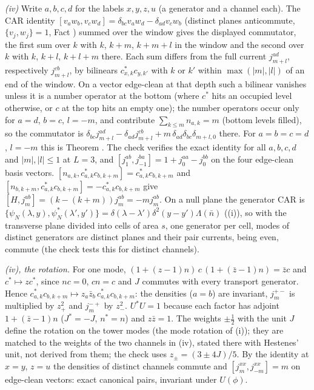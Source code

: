 \emph{(iv)} Write $a, b, c, d$ for the labels $x, y, z, u$ (a generator and a channel each). The CAR identity $[v_{a}w_{b}, v_{c}w_{d}] = \delta_{bc}v_{a}w_{d} - \delta_{ad}v_{c}w_{b}$ (distinct planes anticommute, $\{v_{j}, w_{j}\} = 1$, Fact ) summed over the window gives the displayed commutator, the first sum over $k$ with $k$, $k + m$, $k + m + l$ in the window and the second over $k$ with $k$, $k + l$, $k + l + m$ there. Each sum differs from the full current $j^{ad}_{m+l}$, respectively $j^{cb}_{m+l}$, by bilinears $c_{x,k}^{*}c_{y,k'}$ with $k$ or $k'$ within $\max(|m|, |l|)$ of an end of the window. On a vector edge-clean at that depth such a bilinear vanishes unless it is a number operator at the bottom (where $c^{*}$ hits an occupied level otherwise, or $c$ at the top hits an empty one); the number operators occur only for $a = d$, $b = c$, $l = -m$, and contribute $\sum_{k \le m}n_{a,k} = m$ (bottom levels filled), so the commutator is $\delta_{bc}j^{ad}_{m+l} - \delta_{ad}j^{cb}_{m+l} + m\,\delta_{ad}\delta_{bc}\delta_{m+l,0}$ there. For $a = b = c = d$, $l = -m$ this is Theorem . The check verifies the exact identity for all $a, b, c, d$ and $|m|, |l| \le 1$ at $L = 3$, and $[j^{ab}_{1}, j^{ba}_{-1}] = 1 + j^{aa}_{0} - j^{bb}_{0}$ on the four edge-clean basis vectors. $[n_{a,k}, c_{a,k}^{*}c_{b,k+m}] = c_{a,k}^{*}c_{b,k+m}$ and $[n_{b,k+m}, c_{a,k}^{*}c_{b,k+m}] = -c_{a,k}^{*}c_{b,k+m}$ give $[H, j^{ab}_{m}] = (k - (k + m))j^{ab}_{m} = -mj^{ab}_{m}$. On a null plane the generator CAR is $\{\psi_{N}(\lambda, y), \psi_{N}^{*}(\lambda', y')\} = \delta(\lambda - \lambda')\delta^{2}(y - y')\Lambda(\bar n)$ ((i)), so with the transverse plane divided into cells of area $s$, one generator per cell, modes of distinct generators are distinct planes and their pair currents, being even, commute (the check tests this for distinct channels).

\emph{(iv), the rotation.} For one mode, $(1 + (z - 1)n)\,c\,(1 + (\bar z - 1)n) = \bar z c$ and $c^{*} \mapsto zc^{*}$, since $nc = 0$, $cn = c$ and $J$ commutes with every transport generator. Hence $c_{a,k}^{*}c_{b,k+m} \mapsto z_{a}\bar z_{b}\,c_{a,k}^{*}c_{b,k+m}$: the densities ($a = b$) are invariant, $j^{+-}_{m}$ is multiplied by $z_{+}^{2}$ and $j^{-+}_{m}$ by $z_{-}^{2}$. $U^{*}U = 1$ because each factor has adjoint $1 + (\bar z - 1)n$ ($J^{*} = -J$, $n^{*} = n$) and $z\bar z = 1$. The weights $\pm\tfrac12$ with the unit $J$ define the rotation on the tower modes (the mode rotation of (i)); they are matched to the weights of the two channels in (iv), stated there with Hestenes' unit, not derived from them; the check uses $z_{\pm} = (3 \pm 4J)/5$. By the identity at $x = y$, $z = u$ the densities of distinct channels commute and $[j^{xx}_{m}, j^{xx}_{-m}] = m$ on edge-clean vectors: exact canonical pairs, invariant under $U(\phi)$.

